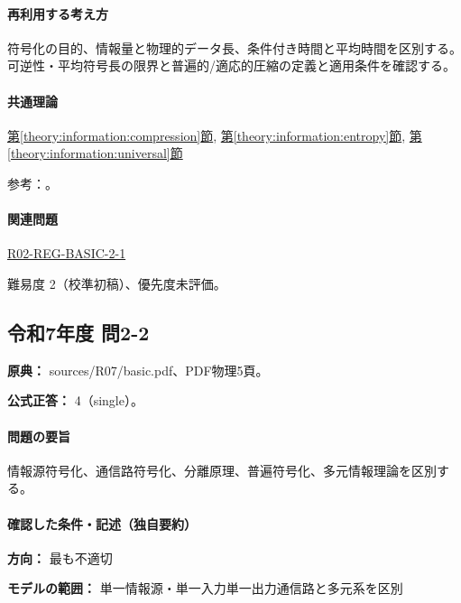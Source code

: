 \paragraph{再利用する考え方} 符号化の目的、情報量と物理的データ長、条件付き時間と平均時間を区別する。可逆性・平均符号長の限界と普遍的/適応的圧縮の定義と適用条件を確認する。

\paragraph{共通理論} \hyperref[theory:information:compression]{第\ref*{theory:information:compression}節}, \hyperref[theory:information:entropy]{第\ref*{theory:information:entropy}節}, \hyperref[theory:information:universal]{第\ref*{theory:information:universal}節}

\par 参考：\cite{info_deflate,info_lossless,info_universal,info_jpeg,info_mpeg}。

\paragraph{関連問題} \hyperref[q:r02-reg-basic-2-1]{R02-REG-BASIC-2-1}

\par 難易度 2（校準初稿）、優先度未評価。

\subsection{令和7年度 問2-2}
\label{q:r07-reg-basic-2-2}

\noindent\textbf{原典：} sources/R07/basic.pdf、PDF物理5頁。

\textbf{公式正答：} 4（single）。

\paragraph{問題の要旨} 情報源符号化、通信路符号化、分離原理、普遍符号化、多元情報理論を区別する。

\paragraph{確認した条件・記述（独自要約）}\mbox{}\par

\noindent\textbf{方向：} 最も不適切\par

\noindent\textbf{モデルの範囲：} 単一情報源・単一入力単一出力通信路と多元系を区別\par

